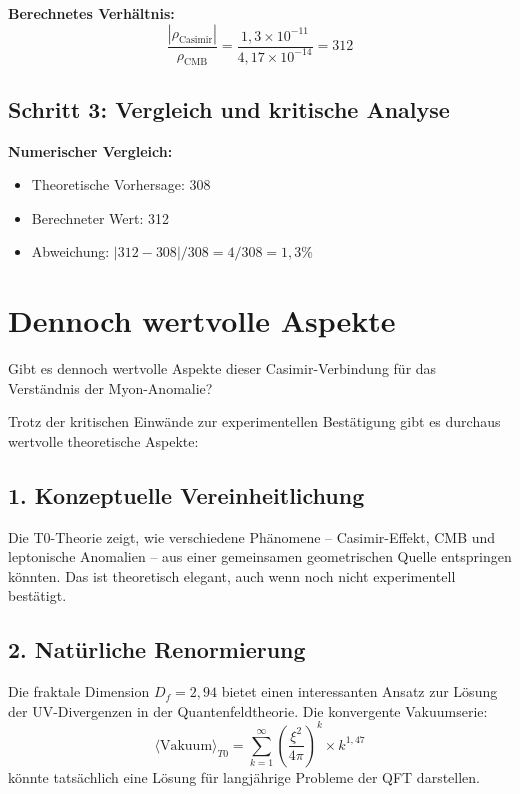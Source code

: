 \documentclass[12pt,a4paper]{article}
\begin{document}
		\textbf{Berechnetes Verh\"altnis:}
		\begin{equation}
			\frac{|\rho_{\text{Casimir}}|}{\rho_{\text{CMB}}} = \frac{1{,}3 \times 10^{-11}}{4{,}17 \times 10^{-14}} = 312
		\end{equation}
		
		\subsection{Schritt 3: Vergleich und kritische Analyse}
		
		\textbf{Numerischer Vergleich:}
		\begin{itemize}
			\item Theoretische Vorhersage: 308
			\item Berechneter Wert: 312
			\item Abweichung: $|312 - 308|/308 = 4/308 = 1{,}3\%$
		\end{itemize}


	\section{Dennoch wertvolle Aspekte}
	
	\begin{question}
		Gibt es dennoch wertvolle Aspekte dieser Casimir-Verbindung f\"ur das Verst\"andnis der Myon-Anomalie?
	\end{question}

		Trotz der kritischen Einw\"ande zur experimentellen Best\"atigung gibt es durchaus wertvolle theoretische Aspekte:
		
		\subsection{1. Konzeptuelle Vereinheitlichung}
		
		Die T0-Theorie zeigt, wie verschiedene Ph\"anomene -- Casimir-Effekt, CMB und leptonische Anomalien -- aus einer gemeinsamen geometrischen Quelle entspringen k\"onnten. Das ist theoretisch elegant, auch wenn noch nicht experimentell best\"atigt.
		
		\subsection{2. Nat\"urliche Renormierung}
		
		Die fraktale Dimension $D_f = 2{,}94$ bietet einen interessanten Ansatz zur L\"osung der UV-Divergenzen in der Quantenfeldtheorie. Die konvergente Vakuumserie:
		\begin{equation}
			\langle \text{Vakuum} \rangle_{T0} = \sum_{k=1}^{\infty} \left(\frac{\xi^2}{4\pi}\right)^k \times k^{1{,}47}
		\end{equation}
		k\"onnte tats\"achlich eine L\"osung f\"ur langj\"ahrige Probleme der QFT darstellen.
		
\end{document}
